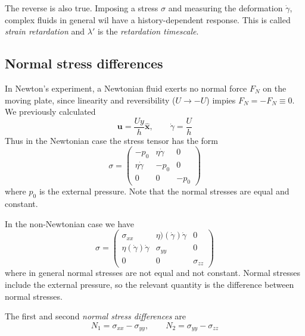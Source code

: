 \documentclass{jknotes}
\begin{document}
The reverse is also true. Imposing a stress $\sigma$ and measuring the
deformation $\dot{\gamma}$, complex fluids in general wil have a
history-dependent response. This is called \emph{strain retardation} and
$\lambda'$ is the \emph{retardation timescale}.

\subsection{Normal stress differences}
In Newton's experiment, a Newtonian fluid exerts no normal force $F_N$ on the moving
plate, since linearity and reversibility ($U \to -U$) impies $F_N = -F_N
\equiv 0$. We previously calculated 
\begin{equation}
	\bm{u} = \frac{Uy}{h}\hat{\bm{x}}, \hspace{2em} \dot{\gamma} = \frac{U}{h}
\end{equation}
Thus in the Newtonian case the stress tensor has the form
\begin{equation}
	\sigma = \begin{pmatrix}
		-p_0 & \eta \dot{\gamma} & 0 \\
		\eta \dot{\gamma} & -p_0 & 0 \\
	0 & 0 & -p_0 \end{pmatrix}
\end{equation}
where $p_0$ is the external pressure. Note that the normal stresses are equal
and constant.

In the non-Newtonian case we have
\begin{equation}
	\sigma = \begin{pmatrix}
		\sigma_{xx} & \eta)(\dot{\gamma}) \dot{\gamma} & 0 \\
		\eta(\dot{\gamma}) \dot{\gamma} & \sigma_{yy} & 0 \\
	0 & 0 & \sigma_{zz} \end{pmatrix}
\end{equation}
where in general normal stresses are not equal and not constant. Normal
stresses include the external pressure, so the relevant quantity is the
difference between normal stresses.
\begin{defn}
	The first and second \emph{normal stress differences} are
	\begin{equation}
		N_1 = \sigma_{xx} - \sigma_{yy}, \hspace{2em} N_2 = \sigma_{yy} -
		\sigma_{zz}
	\end{equation}
\end{defn}
\end{document}
